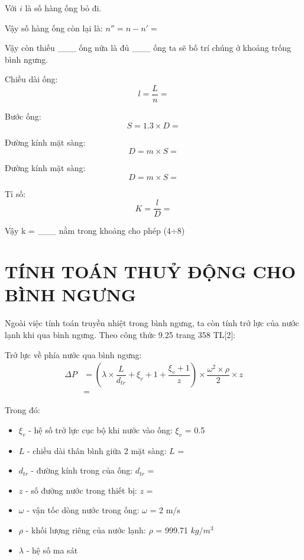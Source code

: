 Với $i$ là số hàng ống bỏ đi.

Vậy số hàng ống còn lại là: $n'' = n - n' = $

Vậy còn thiếu \_\_\_ ống nữa là đủ \_\_\_ ống ta sẽ bố trí chúng ở khoảng trống bình ngưng.

Chiều dài ống:
\begin{equation*}
	l = \dfrac{L}{n} = 
\end{equation*}

Bước ống:
\begin{equation*}
	S = 1.3\times D = 
\end{equation*}

Đường kính mặt sàng:
\begin{equation*}
	D = m\times S = 
\end{equation*}

Đường kính mặt sàng:
\begin{equation*}
	D = m\times S = 
\end{equation*}

Tỉ số:
\begin{equation*}
	K = \dfrac{l}{D} = 
\end{equation*}

Vậy k = \_\_\_ nằm trong khoảng cho phép (4$\div$8)

\section{TÍNH TOÁN THUỶ ĐỘNG CHO BÌNH NGƯNG}
Ngoài việc tính toán truyền nhiệt trong bình ngưng, ta còn tính trở lực của nước lạnh khi qua bình ngưng. Theo công thức 9.25 trang 358 TL[2]:

Trở lực về phía nước qua bình ngưng:
\begin{equation*}
	\begin{split}
		\Delta P &= \left(\lambda\times\dfrac{L}{d_{tr}} +\xi_{v} + 1 + \dfrac{\xi_{v} + 1}{z}\right)\times \dfrac{\omega^2\times\rho}{2}\times z\\
		&=  
	\end{split}
\end{equation*}

Trong đó:
\begin{itemize}
	\item $\xi_{v}$ - hệ số trở lực cục bộ khi nước vào ống: $\xi_{v}$ = 0.5
	\item $L$ - chiều dài thân bình giữa 2 mặt sàng: $L$ = 
	\item $d_{tr}$ - đường kính trong của ống: $d_{tr}$ =
	\item $z$ - số đường nước trong thiết bị: $z$ = 
	\item $\omega$ - vận tốc dòng nước trong ống: $\omega$ = 2 m/s
	\item $\rho$ - khối lượng riêng của nước lạnh: $\rho$ = 999.71 $kg/m^3$
	\item $\lambda$ - hệ số ma sát	
\end{itemize}

